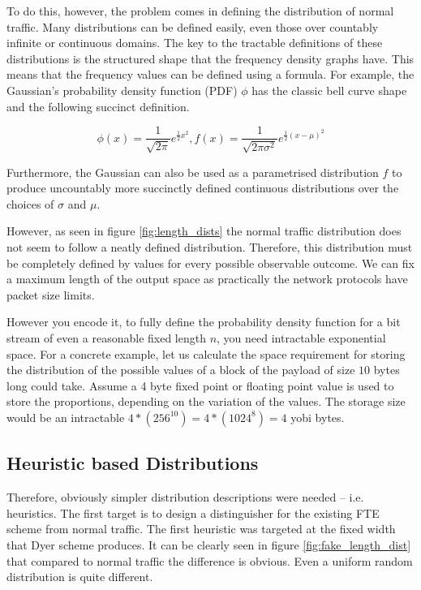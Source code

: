 \documentclass[ %
                    author={Samuel Russell},
                supervisor={Prof. Bogdan Warinschi},
                    degree={MEng},
                     title={Innocuous Ciphertexts},
                  subtitle={The DE-CENSOR Scheme},
                      type={Research},
                      year={2018} ]{dissertation}
\begin{document}
To do this, however, the problem comes in defining the distribution of normal traffic.
Many distributions can be defined easily, even those over countably infinite or continuous domains.
The key to the tractable definitions of these distributions is the structured shape that the frequency density graphs have.
This means that the frequency values can be defined using a formula.
For example, the Gaussian's probability density function (PDF) $\phi$ has the classic bell curve shape and the following succinct definition.

$$\phi (x) = \frac{1}{\sqrt{2\pi}}e^{\frac{1}{2}x^2}, f(x) = \frac{1}{\sqrt{2\pi\sigma^2}}e^{\frac{1}{2}(x-\mu)^2}$$

Furthermore, the Gaussian can also be used as a parametrised distribution $f$ to produce uncountably more succinctly defined continuous distributions over the choices of $\sigma$ and $\mu$.

However, as seen in figure \ref{fig:length_dists} the normal traffic distribution does not seem to follow a neatly defined distribution.
Therefore, this distribution must be completely defined by values for every possible observable outcome.
We can fix a maximum length of the output space as practically the network protocols have packet size limits.

However you encode it, to fully define the probability density function for a bit stream of even a reasonable fixed length $n$, you need intractable exponential space.
For a concrete example, let us calculate the space requirement for storing the distribution of the possible values of a block of the payload of size $10$ bytes long could take.
Assume a 4 byte fixed point or floating point value is used to store the proportions, depending on the variation of the values.
The storage size would be an intractable $4*(256^10) = 4*(1024^8) = 4$ yobi bytes.

\subsection{Heuristic based Distributions}

Therefore, obviously simpler distribution descriptions were needed -- i.e. heuristics.
The first target is to design a distinguisher for the existing FTE scheme from normal traffic.
The first heuristic was targeted at the fixed width that Dyer scheme produces.
It can be clearly seen in figure \ref{fig:fake_length_dist} that compared to normal traffic the difference is obvious.
Even a uniform random distribution is quite different.
\end{document}
